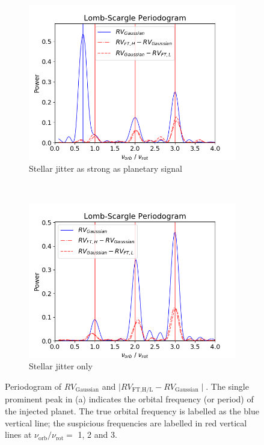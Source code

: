 \begin{figure}[htbp]	
    \begin{subfigure}[b]{0.49\textwidth}
        \includegraphics[width=\textwidth]{./Figures/Methods/0-Periodogram_1.png}
        \caption{Stellar jitter as strong as planetary signal}
        \label{fig:Periodogram1}
    \end{subfigure}
	~
    \begin{subfigure}[b]{0.49\textwidth}
        \includegraphics[width=\textwidth]{./Figures/Methods/0-Periodogram_2.png}
        \caption{Stellar jitter only}
        \label{fig:Periodogram2}
    \end{subfigure}	
    \caption[Periodogram combined with the Fourier phase spectrum analysis]
    {Periodogram of $RV_\text{Gaussian}$ and $\mid RV_\text{FT,H/L} - RV_\text{Gaussian} \mid$. The single prominent peak in (a) indicates the orbital frequency (or period) of the injected planet. The true orbital frequency is labelled as the blue vertical line; the suspicious frequencies are labelled in red vertical lines at $\nu_\text{orb}/\nu_\text{rot} =$ 1, 2 and 3.}
\label{fig:Periodogram}
\end{figure}    



